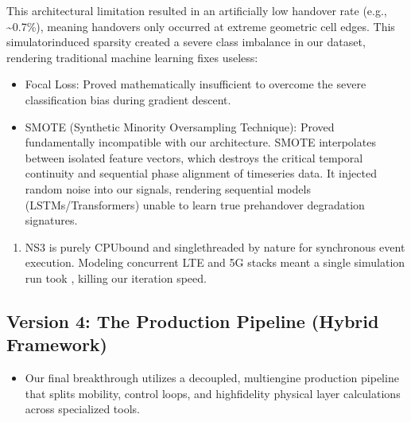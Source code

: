 \documentclass[letterpaper,10pt,english]{sphinxmanual}
\begin{document}
\sphinxAtStartPar
This architectural limitation resulted in an artificially low handover rate (e.g., \textasciitilde{}0.7\%), meaning handovers only occurred at extreme geometric cell edges. This simulator\sphinxhyphen{}induced sparsity created a severe class imbalance in our dataset, rendering traditional machine learning fixes useless:
\begin{itemize}
\item {} 
\sphinxAtStartPar
Focal Loss: Proved mathematically insufficient to overcome the severe classification bias during gradient descent.

\item {} 
\sphinxAtStartPar
SMOTE (Synthetic Minority Over\sphinxhyphen{}sampling Technique): Proved fundamentally incompatible with our architecture. SMOTE interpolates between isolated feature vectors, which destroys the critical temporal continuity and sequential phase alignment of time\sphinxhyphen{}series data. It injected random noise into our signals, rendering sequential models (LSTMs/Transformers) unable to learn true pre\sphinxhyphen{}handover degradation signatures.

\end{itemize}
\begin{enumerate}
%
\setcounter{enumi}{1}
\item {} 
\sphinxAtStartPar
{} NS\sphinxhyphen{}3 is purely CPU\sphinxhyphen{}bound and single\sphinxhyphen{}threaded by nature for synchronous event execution. Modeling concurrent LTE and 5G stacks meant a single simulation run took , killing our iteration speed.

\end{enumerate}


\subsection{Version 4: The Production Pipeline (Hybrid Framework)}
\label{\detokenize{dataset:version-4-the-production-pipeline-hybrid-framework}}\begin{itemize}
\item {} 
\sphinxAtStartPar
{} Our final breakthrough utilizes a decoupled, multi\sphinxhyphen{}engine production pipeline that splits mobility, control loops, and high\sphinxhyphen{}fidelity physical layer calculations across specialized tools.

\end{itemize}
\end{document}
